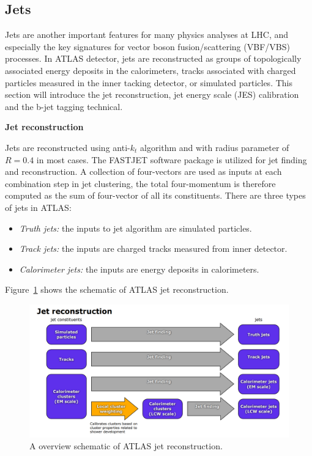 \subsection{Jets}
\label{sec:jet}

Jets are another important features for many physics analyses at LHC, and especially the key signatures for vector boson fusion/scattering (VBF/VBS) processes.
In ATLAS detector, jets are reconstructed as groups of topologically associated energy deposits in the calorimeters, 
tracks associated with charged particles measured in the inner tacking detector, or simulated particles.
This section will introduce the jet reconstruction, jet energy scale (JES) calibration and the b-jet tagging technical.

\textbf{Jet reconstruction}

Jets are reconstructed using anti-$k_{t}$ algorithm\cite{Cacciari_2008} and with radius parameter of $R = 0.4$ in most cases.
The FASTJET software package\cite{Cacciari2012} is utilized for jet finding and reconstruction.
A collection of four-vectors are used as inputs at each combination step in jet clustering, 
the total four-momentum is therefore computed as the sum of four-vector of all its constituents.
There are three types of jets in ATLAS:
\begin{itemize}
	\item \textit{Truth jets:} the inputs to jet algorithm are simulated particles.
	\item \textit{Track jets:} the inputs are charged tracks measured from inner detector.
	\item \textit{Calorimeter jets:} the inputs are energy deposits in calorimeters.
\end{itemize}
Figure~\ref{fig:jet_reco_overview} shows the schematic of ATLAS jet reconstruction.
\begin{figure}[!htb]
  \centering
  \includegraphics[width=1.0\textwidth]{figures/Simulation/threetypes_jet_reco.png}
  \caption{A overview schematic of ATLAS jet reconstruction\cite{Aad:2014bia}.}
  \label{fig:jet_reco_overview}
\end{figure}

